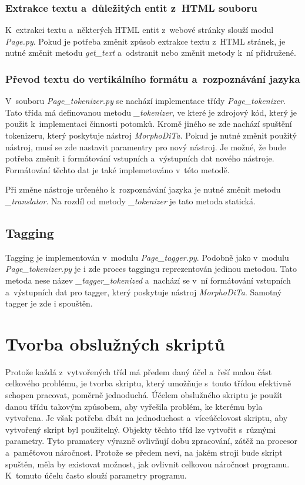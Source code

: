 \subsubsection{Extrakce textu a~důležitých entit z~HTML souboru}
K~extrakci textu a~některých HTML entit z~webové stránky slouží modul \textit{Page.py}.
Pokud je potřeba změnit způsob extrakce textu z~HTML stránek, je nutné změnit
metodu \textit{get\_text} a~odstranit nebo změnit metody k~ní přidružené.

\subsubsection{Převod textu do vertikálního formátu a~rozpoznávání jazyka}
V~souboru \textit{Page\_tokenizer.py} se nachází implementace třídy \textit{Page\_tokenizer}.
Tato třída má definovanou metodu \textit{\_tokenizer}, ve které je zdrojový kód, který
je použit k~implementaci činnosti potomků. Kromě jiného se zde nachází spuštění tokenizeru,
který poskytuje nástroj \textit{MorphoDiTa}. Pokud je nutné změnit použitý nástroj,
musí se zde nastavit paramentry pro nový nástroj. Je možné, že bude potřeba změnit i formátování
vstupních a~výstupních dat nového nástroje. Formátování těchto dat je také implemetováno v~této
metodě.

Při změne nástroje určeného k~rozpoznávání jazyka je nutné změnit metodu \textit{\_translator}.
Na rozdíl od metody \textit{\_tokenizer} je tato metoda statická.

\subsection{Tagging}
Tagging je implementován v~modulu \textit{Page\_tagger.py}. Podobně jako v~modulu
\textit{Page\_tokenizer.py} je i zde proces taggingu reprezentován jedinou metodou.
Tato metoda nese název \textit{\_tagger\_tokenized} a~nachází se v~ní formátování
vstupních a~výstupních dat pro tagger, který poskytuje nástroj \textit{MorphoDiTa}.
Samotný tagger je zde i spouštěn.

\section{Tvorba obslužných skriptů}
Protože každá z~vytvořených tříd má předem daný účel a~řeší malou část celkového problému,
je tvorba skriptu, který umožňuje s~touto třídou efektivně schopen pracovat, poměrně jednoduchá. Účelem obslužného skriptu
je použít danou třídu takovým způsobem, aby vyřešila problém, ke kterému byla vytvořena. Je však
potřeba dbát na jednoduchost a~víceúčelovost skriptu, aby vytvořený skript byl použitelný. Objekty
těchto tříd lze vytvořit s~různými parametry. Tyto pramatery výrazně ovlivňují dobu zpracování,
zátěž na procesor a~paměťovou náročnost. Protože se předem neví, na jakém stroji bude skript spuštěn,
měla by existovat možnost, jak ovlivnit celkovou náročnost programu. K~tomuto účelu často slouží
parametry programu.

